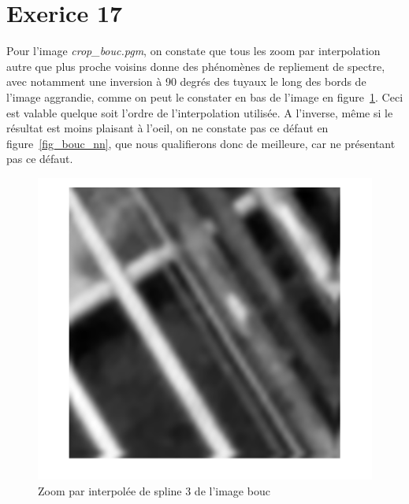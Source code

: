 \documentclass[12pt,a4paper,onecolumn]{article}
\begin{document}
\setcounter{section}{16}
\section{Exerice 17}

Pour l'image \textit{crop\_bouc.pgm}, on constate que tous les zoom par interpolation autre que plus proche voisins donne des phénomènes de repliement de spectre, avec notamment une inversion à 90 degrés des tuyaux le long des bords de l'image aggrandie, comme on peut le constater en bas de l'image en figure~\ref{fig_bouc_3}. Ceci est valable quelque soit l'ordre de l'interpolation utilisée. A l'inverse, même si le résultat est moins plaisant à l'oeil, on ne constate pas ce défaut en figure~\ref{fig_bouc_nn}, que nous qualifierons donc de meilleure, car ne présentant pas ce défaut.

\begin{figure}[H]
	\centering
	\includegraphics[height = 0.4\textheight]{bouc_3}
	\caption{Zoom par interpolée de spline 3 de l'image bouc}
	\label{fig_bouc_3}
\end{figure}
\end{document}
